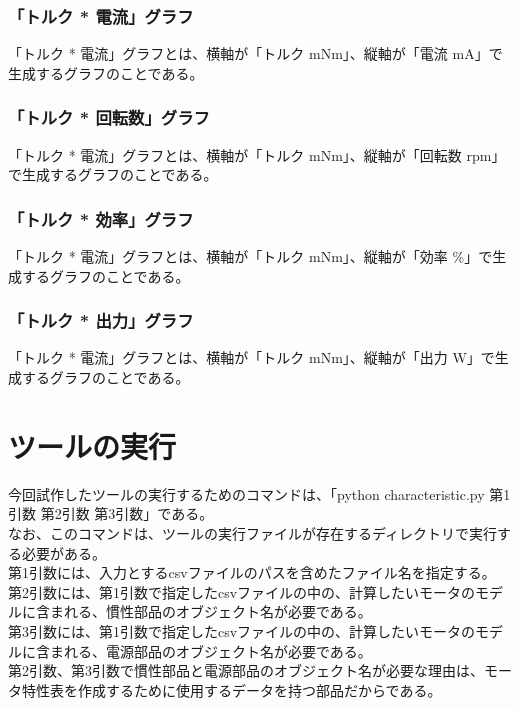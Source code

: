 \subsubsection{「トルク * 電流」グラフ}\label{sub:sub:torden}
「トルク * 電流」グラフとは、横軸が「トルク mNm」、縦軸が「電流 mA」で生成するグラフのことである。
\subsubsection{「トルク * 回転数」グラフ}\label{sub:sub:torkaiten}
「トルク * 電流」グラフとは、横軸が「トルク mNm」、縦軸が「回転数 rpm」で生成するグラフのことである。
\subsubsection{「トルク * 効率」グラフ}\label{sub:sub:torkouritu}
「トルク * 電流」グラフとは、横軸が「トルク mNm」、縦軸が「効率 \%」で生成するグラフのことである。
\subsubsection{「トルク * 出力」グラフ}\label{sub:sub:torsyutu}
「トルク * 電流」グラフとは、横軸が「トルク mNm」、縦軸が「出力 W」で生成するグラフのことである。
\section{ツールの実行}\label{zikkou}
今回試作したツールの実行するためのコマンドは、「python characteristic.py 第1引数 第2引数 第3引数」である。\\
なお、このコマンドは、ツールの実行ファイルが存在するディレクトリで実行する必要がある。\\
第1引数には、入力とするcsvファイルのパスを含めたファイル名を指定する。\\
第2引数には、第1引数で指定したcsvファイルの中の、計算したいモータのモデルに含まれる、慣性部品のオブジェクト名が必要である。\\
第3引数には、第1引数で指定したcsvファイルの中の、計算したいモータのモデルに含まれる、電源部品のオブジェクト名が必要である。\\
第2引数、第3引数で慣性部品と電源部品のオブジェクト名が必要な理由は、モータ特性表を作成するために使用するデータを持つ部品だからである。

